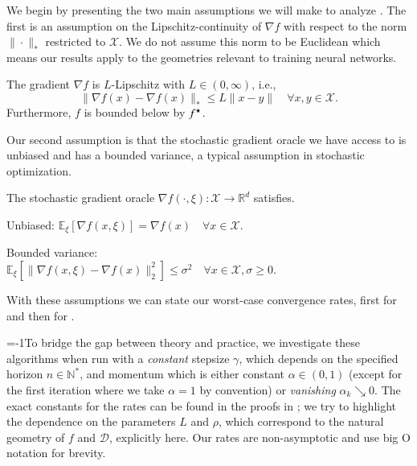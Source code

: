 We begin by presenting the two main assumptions we will make to analyze . The first is an assumption on the Lipschitz-continuity of $\nabla f$ with respect to the norm $\|\cdot\|_{\ast}$ restricted to $\mathcal{X}$. We do not assume this norm to be Euclidean which means our results apply to the geometries relevant to training neural networks.
\begin{assumption}\label{asm:Lip} The gradient $\nabla f$ is $L$-Lipschitz with $L \in (0,\infty)$, i.e.,
    \begin{equation}
    \|\nabla f(x) - \nabla f(x)\|_{\ast}
    \leq
    L\|x-y\|
    \quad \forall x,y \in \mathcal X.
    \end{equation}
Furthermore, $f$ is bounded below by $f^\star$.
\end{assumption}
Our second assumption is that the stochastic gradient oracle we have access to is unbiased and has a bounded variance, a typical assumption in stochastic optimization.
\begin{assumption}\label{asm:stoch}
The stochastic gradient oracle $\nabla f(\cdot,\xi):\mathcal X\rightarrow \mathbb{R}^d$ satisfies.
    \begin{assnum}
        \item \label{asm:stoch:unbiased}
            Unbiased:
            \(%
                \mathbb{E}_{\xi}\left[\nabla f(x,\xi)\right] = \nabla f(x) \quad \forall x \in \mathcal X
            \).%
        \item  \label{asm:stoch:var}
            Bounded variance:\\
            \(%
                \mathbb{E}_{\xi}\left[\|\nabla f(x,\xi)-\nabla f(x)\|_2^2\right] \leq \sigma^2  \quad \forall x \in \mathcal X,\sigma\geq 0
            \).%
    \end{assnum}
\end{assumption}

With these assumptions we can state our worst-case convergence rates, first for  and then for . 

\looseness=-1To bridge the gap between theory and practice, we investigate these algorithms when run with a \emph{constant} stepsize $\gamma$, which depends on the specified horizon $n\in\mathbb{N}^*$, and momentum which is either constant $\alpha\in(0,1)$ (except for the first iteration where we take $\alpha=1$ by convention) or \emph{vanishing} $\alpha_k\searrow 0$. The exact constants for the rates can be found in the proofs in ; we try to highlight the dependence on the parameters $L$ and $\rho$, which correspond to the natural geometry of $f$ and $\mathcal{D}$, explicitly here. Our rates are non-asymptotic and use big O notation for brevity.

